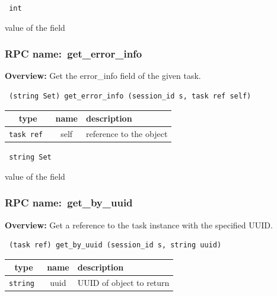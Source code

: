 \vspace{0.3cm}

{\tt 
int
}


value of the field
\vspace{0.3cm}
\vspace{0.3cm}
\vspace{0.3cm}
\subsubsection{RPC name:~get\_error\_info}

{\bf Overview:} 
Get the error\_info field of the given task.

\begin{verbatim} (string Set) get_error_info (session_id s, task ref self)\end{verbatim}



 
\vspace{0.3cm}
\begin{tabular}{|c|c|p{7cm}|}
 \hline
{\bf type} & {\bf name} & {\bf description} \\ \hline
{\tt task ref } & self & reference to the object \\ \hline 

\end{tabular}

\vspace{0.3cm}

{\tt 
string Set
}


value of the field
\vspace{0.3cm}
\vspace{0.3cm}
\vspace{0.3cm}
\subsubsection{RPC name:~get\_by\_uuid}

{\bf Overview:} 
Get a reference to the task instance with the specified UUID.

\begin{verbatim} (task ref) get_by_uuid (session_id s, string uuid)\end{verbatim}



 
\vspace{0.3cm}
\begin{tabular}{|c|c|p{7cm}|}
 \hline
{\bf type} & {\bf name} & {\bf description} \\ \hline
{\tt string } & uuid & UUID of object to return \\ \hline 

\end{tabular}

